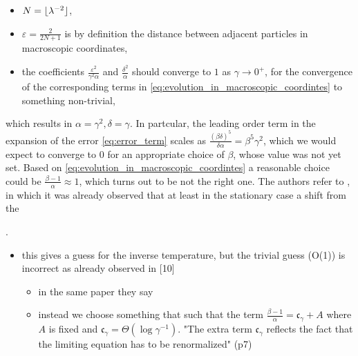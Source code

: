 \documentclass{report}
\DeclarePairedDelimiter\floor{\lfloor}{\rfloor}
\theoremstyle{remark}
\theoremstyle{definition}
\newcommand{\TODO}[1]{\text{\textcolor{red}{TODO: #1}}\xspace}
\let\epsilon\varepsilon
\begin{document}
\begin{itemize}
  \item $N = \floor{\lambda^{-2}}$,
  \item  $\epsilon = \frac{2}{2N + 1}$ is by definition the distance between adjacent particles in macroscopic coordinates,
  \item the coefficients $\frac{\epsilon^2}{\gamma^2 \alpha}$ and $\frac{\delta^2}{\alpha}$ should converge to $1$ as $\gamma \to 0^+$, for the convergence of the corresponding terms in \eqref{eq:evolution_in_macroscopic_coordintes} to something non-trivial,
\end{itemize}
which results in $\alpha = \gamma^2, \delta=\gamma$. In partcular, the leading order term in the expansion of the error \eqref{eq:error_term} scales as $\frac{(\beta \delta)^5}{\delta\alpha} = \beta^5 \gamma^2$, which we would expect to converge to $0$ for an appropriate choice of $\beta$, whose value was not yet set. Based on \eqref{eq:evolution_in_macroscopic_coordintes} a reasonable choice could be $\frac{\beta - 1}{\alpha} \approx 1$, which turns out to be not the right one. The authors refer to \cite{cassandro1997upper}, in which it was already observed that at least in the stationary case a shift from the 


\TODO{finish this phrase, conclude from (2.18) that it's a logarithmically divergent term}.

\TODO{state the evolution equation with all the terms replaced, also redefined the $\Delta$ operator}

\begin{itemize}
  \item this gives a guess for the inverse temperature, but the trivial guess (O(1)) is incorrect as already observed in [10]
  \begin{itemize}
    \item in the same paper they say 
    \item instead we choose something that such that the term $\frac{\beta -1}{\alpha} = \mathfrak{c}_\gamma +A$ where $A$ is fixed and $\mathfrak{c}_\gamma = \Theta(\log{\gamma^{-1}})$. "The extra term $\mathfrak{c}_\gamma$ reflects the fact that the limiting equation has to be renormalized" (p7)
  \end{itemize}
\end{itemize}
\end{document}
